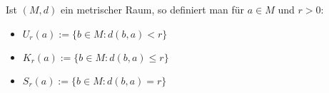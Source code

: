 Ist $(M, d)$ ein metrischer Raum, so definiert man für $a \in M$ und $r > 0$:
\begin{itemize}[label={},leftmargin=*]
    \item {} $U_r(a) := \{ b \in M: d(b, a) < r \}$
    \item {} $K_r(a) := \{ b \in M: d(b, a) \leq r \}$
    \item {} $S_r(a) := \{ b \in M: d(b, a) = r \}$
\end{itemize}